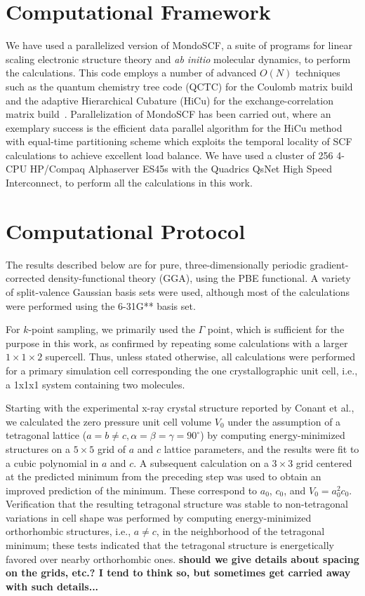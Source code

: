 \documentclass[prb,aps,nobibnotes,twocolumn,doublespace,twocolumngrid,superbib]{revtex4}
\begin{document}
\section{Computational Framework}
\label{sec:comput}
We have used a parallelized version of MondoSCF\cite{MondoSCF}, 
a suite of programs
for linear scaling electronic structure theory and {\it ab initio}\/
molecular dynamics, to perform the calculations.  This code employs a
number of advanced $O(N)$ techniques such as the quantum chemistry tree code
(QCTC) for the Coulomb matrix build
\cite{MChallacombe96,MChallacombe96B,MChallacombe97} and
the adaptive Hierarchical Cubature (HiCu) for the exchange-correlation 
matrix build~\cite{MChallacombe00A}. Parallelization of MondoSCF
has been carried out, where an exemplary success is 
the efficient data parallel algorithm for the
HiCu method\cite{CGan03} with equal-time partitioning scheme
which exploits the temporal locality of SCF 
calculations to achieve excellent load
balance. We have
used a cluster of 256 4-CPU HP/Compaq Alphaserver ES45s with the
Quadrics QsNet High Speed Interconnect, to perform all the calculations 
in this work. 

\section{Computational Protocol}
\label{sec:protocol}
The results described below are for pure, three-dimensionally periodic 
gradient-corrected density-functional theory (GGA), using the PBE
functional\cite{Perdew_96v77}. A variety of split-valence Gaussian
basis sets were used, although most of the calculations were performed
using the 6-31G** basis set. 

For $k$-point sampling, we primarily used the $\Gamma$ point, which is 
sufficient for the purpose in this work, as confirmed by repeating some 
calculations with a larger $1 \times 1 \times 2 $ supercell.
Thus, unless stated otherwise, all calculations were performed for a
primary simulation cell corresponding the one crystallographic
unit cell, i.e., a 1x1x1 system containing two molecules.  

Starting with the experimental x-ray crystal structure reported by
Conant et al., we calculated the zero pressure unit cell volume $V_0$ 
under the assumption of a tetragonal lattice ($a=b\neq c, 
\alpha=\beta=\gamma=90^\circ$) by computing energy-minimized structures
on a $5\times 5$ grid of $a$ and $c$ lattice parameters, 
and the results were fit
to a cubic polynomial in $a$ and $c$.  A subsequent calculation
on a $3 \times 3$ grid centered at the predicted minimum from the preceding step
was used to obtain an improved prediction of the minimum.  These
correspond to $a_0$, $c_0$, and $V_0=a_0^2c_0$.  Verification that
the resulting tetragonal structure was stable to non-tetragonal variations
in cell shape was performed by computing energy-minimized orthorhombic
structures, i.e., $a\neq c$, in the neighborhood of the tetragonal minimum; 
these tests indicated that the tetragonal structure is energetically favored 
over nearby orthorhombic ones.  {\bf should we give details about spacing 
on the grids, etc.?  I tend to think so, but sometimes get carried away
with such details...}
\end{document}
